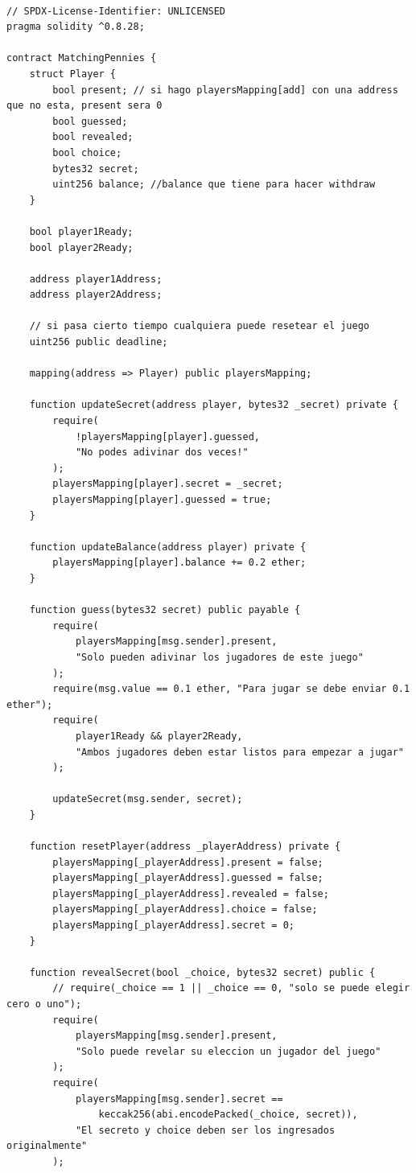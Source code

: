 \documentclass[12pt,addpoints,answers]{exam}
\begin{document}
\begin{questions}
\begin{parts}
\newpage

\begin{verbatim}

// SPDX-License-Identifier: UNLICENSED
pragma solidity ^0.8.28;

contract MatchingPennies {
    struct Player {
        bool present; // si hago playersMapping[add] con una address que no esta, present sera 0
        bool guessed;
        bool revealed;
        bool choice;
        bytes32 secret;
        uint256 balance; //balance que tiene para hacer withdraw
    }

    bool player1Ready;
    bool player2Ready;

    address player1Address;
    address player2Address;

    // si pasa cierto tiempo cualquiera puede resetear el juego
    uint256 public deadline;

    mapping(address => Player) public playersMapping;

    function updateSecret(address player, bytes32 _secret) private {
        require(
            !playersMapping[player].guessed,
            "No podes adivinar dos veces!"
        );
        playersMapping[player].secret = _secret;
        playersMapping[player].guessed = true;
    }

    function updateBalance(address player) private {
        playersMapping[player].balance += 0.2 ether;
    }

    function guess(bytes32 secret) public payable {
        require(
            playersMapping[msg.sender].present,
            "Solo pueden adivinar los jugadores de este juego"
        );
        require(msg.value == 0.1 ether, "Para jugar se debe enviar 0.1 ether");
        require(
            player1Ready && player2Ready,
            "Ambos jugadores deben estar listos para empezar a jugar"
        );

        updateSecret(msg.sender, secret);
    }

    function resetPlayer(address _playerAddress) private {
        playersMapping[_playerAddress].present = false;
        playersMapping[_playerAddress].guessed = false;
        playersMapping[_playerAddress].revealed = false;
        playersMapping[_playerAddress].choice = false;
        playersMapping[_playerAddress].secret = 0;
    }

    function revealSecret(bool _choice, bytes32 secret) public {
        // require(_choice == 1 || _choice == 0, "solo se puede elegir cero o uno");
        require(
            playersMapping[msg.sender].present,
            "Solo puede revelar su eleccion un jugador del juego"
        );
        require(
            playersMapping[msg.sender].secret ==
                keccak256(abi.encodePacked(_choice, secret)),
            "El secreto y choice deben ser los ingresados originalmente"
        );


\end{verbatim}
\end{parts}
\end{questions}
\end{document}
